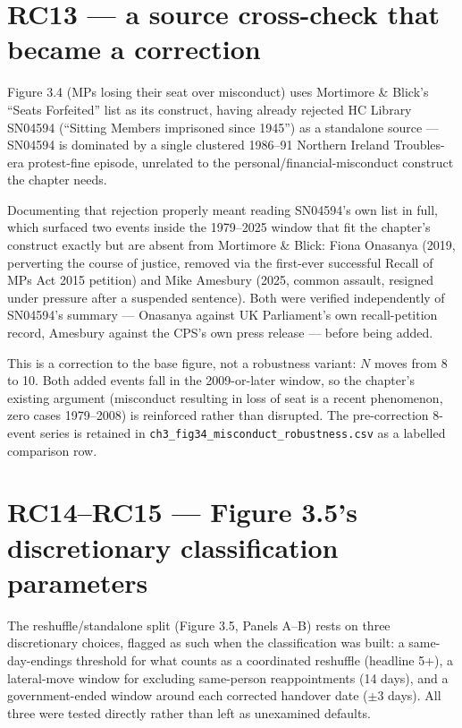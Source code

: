 \section{RC13 --- a source cross-check that became a correction}

Figure 3.4 (MPs losing their seat over misconduct) uses Mortimore \& Blick's ``Seats Forfeited''
list as its construct, having already rejected HC Library SN04594 (``Sitting Members imprisoned
since 1945'') as a standalone source --- SN04594 is dominated by a single clustered 1986--91
Northern Ireland Troubles-era protest-fine episode, unrelated to the personal/financial-misconduct
construct the chapter needs.

Documenting that rejection properly meant reading SN04594's own list in full, which surfaced two
events inside the 1979--2025 window that fit the chapter's construct exactly but are absent from
Mortimore \& Blick: Fiona Onasanya (2019, perverting the course of justice, removed via the
first-ever successful Recall of MPs Act 2015 petition) and Mike Amesbury (2025, common assault,
resigned under pressure after a suspended sentence). Both were verified independently of SN04594's
summary --- Onasanya against UK Parliament's own recall-petition record, Amesbury against the CPS's
own press release --- before being added.

This is a correction to the base figure, not a robustness variant: $N$ moves from 8 to 10.
Both added events fall in the 2009-or-later window, so the chapter's existing argument (misconduct
resulting in loss of seat is a recent phenomenon, zero cases 1979--2008) is reinforced rather than
disrupted. The pre-correction 8-event series is retained in
\texttt{ch3\_fig34\_misconduct\_robustness.csv} as a labelled comparison row.

\section{RC14--RC15 --- Figure 3.5's discretionary classification parameters}

The reshuffle/standalone split (Figure 3.5, Panels A--B) rests on three discretionary choices,
flagged as such when the classification was built: a same-day-endings threshold for what counts as
a coordinated reshuffle (headline 5+), a lateral-move window for excluding same-person
reappointments (14 days), and a government-ended window around each corrected handover date
($\pm$3 days). All three were tested directly rather than left as unexamined defaults.

